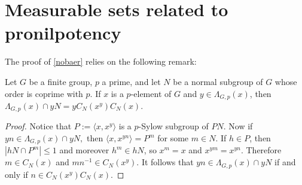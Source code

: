 \documentclass{amsart}
\DeclareMathOperator{\perm}{Sym}
\DeclareMathOperator{\fit}{Fit}
\numberwithin{equation}{section}
\begin{document}
\section{Measurable sets related to pronilpotency} \label{Lambda}

The proof of \cref{nobaer} relies on the following remark:

\begin{lemma}\label{sumcent}Let $G$ be a finite group, $p$ a prime, and let $N$ be a normal subgroup of $G$ whose order is coprime with $p.$ If $x$ is a $p$-element of $G$ and $y\in \Lambda_{G,p}(x)$, then
$\Lambda_{G,p}(x) \cap yN=yC_N(x^y)C_N(x)$.
\end{lemma}

\begin{proof}
Notice that $P:=\langle x, x^y\rangle$ is a $p$-Sylow subgroup of $PN.$ Now if $yn \in \Lambda_{G,p}(x) \cap yN,$ then $\langle x, x^{yn}\rangle=P^m$ for some $m\in N.$ If $h \in P$, then $|hN \cap P^m| \leq 1$ and moreover $h^m \in hN$, so $x^m=x$ and $x^{ym}=x^{yn}$. Therefore $m \in C_N(x)$ and
$mn^{-1}\in C_N(x^y).$ It follows that $yn \in \Lambda_{G,p}(x) \cap yN$ if and only if $n\in C_N(x^y)C_N(x)$.
\end{proof}

\end{document}
